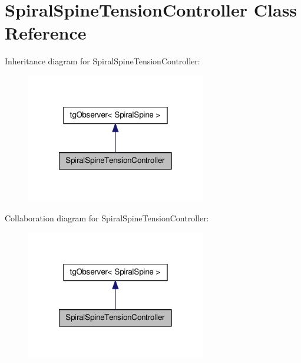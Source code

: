 \hypertarget{class_spiral_spine_tension_controller}{\section{Spiral\-Spine\-Tension\-Controller Class Reference}
\label{class_spiral_spine_tension_controller}
}


Inheritance diagram for Spiral\-Spine\-Tension\-Controller\-:\nopagebreak
\begin{figure}[H]
\begin{center}
\leavevmode
\includegraphics[width=222pt]{class_spiral_spine_tension_controller__inherit__graph}
\end{center}
\end{figure}


Collaboration diagram for Spiral\-Spine\-Tension\-Controller\-:\nopagebreak
\begin{figure}[H]
\begin{center}
\leavevmode
\includegraphics[width=222pt]{class_spiral_spine_tension_controller__coll__graph}
\end{center}
\end{figure}
